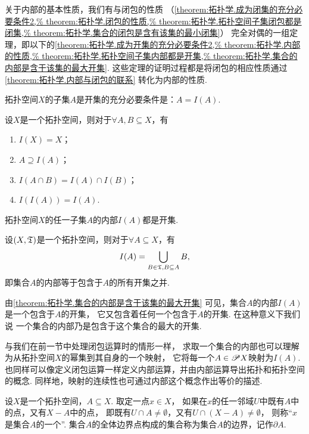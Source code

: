 关于内部的基本性质，我们有与闭包的性质
（\cref{theorem:拓扑学.成为闭集的充分必要条件2,%
theorem:拓扑学.闭包的性质,%
theorem:拓扑学.拓扑空间子集闭包都是闭集,%
theorem:拓扑学.集合的闭包是含有该集的最小闭集}）
完全对偶的一组定理，即以下的\cref{theorem:拓扑学.成为开集的充分必要条件2,%
theorem:拓扑学.内部的性质,%
theorem:拓扑学.拓扑空间子集内部都是开集,%
theorem:拓扑学.集合的内部是含于该集的最大开集}.
这些定理的证明过程都是将闭包的相应性质通过\cref{theorem:拓扑学.内部与闭包的联系}
转化为内部的性质.

\begin{theorem}\label{theorem:拓扑学.成为开集的充分必要条件2}
拓扑空间\(X\)的子集\(A\)是开集的充分必要条件是：\(A = I(A)\).
\end{theorem}

\begin{theorem}\label{theorem:拓扑学.内部的性质}
设\(X\)是一个拓扑空间，则对于\(\forall A,B \subseteq X\)，有
\begin{enumerate}
	\item \(I(X) = X\)；
	\item \(A \supseteq I(A)\)；
	\item \(I(A \cap B) = I(A) \cap I(B)\)；
	\item \(I(I(A)) = I(A)\).
\end{enumerate}
\end{theorem}

\begin{theorem}\label{theorem:拓扑学.拓扑空间子集内部都是开集}
拓扑空间\(X\)的任一子集\(A\)的内部\(I(A)\)都是开集.
\end{theorem}

\begin{theorem}\label{theorem:拓扑学.集合的内部是含于该集的最大开集}
设\((X,\mathfrak T)\)是一个拓扑空间，则对于\(\forall A \subseteq X\)，有\[
I(A) = \bigcup_{B \in \mathfrak T, B \subseteq A} B,
\]
即集合\(A\)的内部等于包含于\(A\)的所有开集之并.
\end{theorem}

由\cref{theorem:拓扑学.集合的内部是含于该集的最大开集}
可见，集合\(A\)的内部\(I(A)\)是一个包含于\(A\)的开集，
它又包含着任何一个包含于\(A\)的开集.
在这种意义下我们说
一个集合的内部乃是包含于这个集合的最大的开集.

与我们在前一节中处理闭包运算时的情形一样，
求取一个集合的内部也可以理解为从拓扑空间\(X\)的幂集到其自身的一个映射，
它将每一个\(A \in \mathscr{P} X\)映射为\(I(A)\).
也同样可以像定义闭包运算一样定义内部运算，并由内部运算导出拓扑和拓扑空间的概念.
同样地，映射的连续性也可通过内部这个概念作出等价的描述.

\begin{definition}\label{definition:拓扑学.边界的概念}
设\(X\)是一个拓扑空间，\(A \subseteq X\).
取定一点\(x \in X\)，
如果在\(x\)的任一邻域\(U\)中既有\(A\)中的点，又有\(X - A\)中的点，
即既有\(U \cap A \neq \emptyset\)，又有\(U \cap (X-A) \neq \emptyset\)，
则称“\(x\)是集合\(A\)的一个”.
集合\(A\)的全体边界点构成的集合称为集合\(A\)的边界，记作\(\partial A\).
\end{definition}

\endgroup
